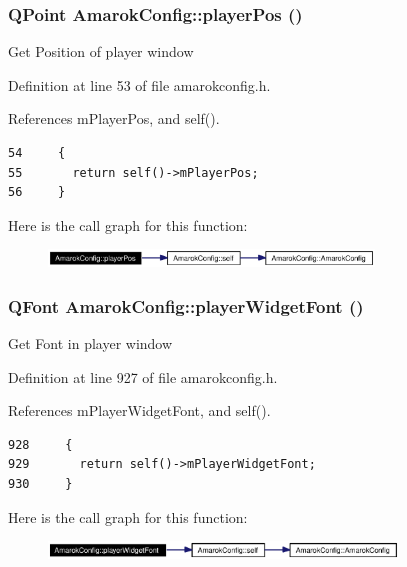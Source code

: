 \subsubsection{\setlength{\rightskip}{0pt plus 5cm}QPoint Amarok\-Config::player\-Pos ()\hspace{0.3cm}{\tt  [inline, static]}}\label{classAmarokConfig_AmarokConfige4}


Get Position of player window 

Definition at line 53 of file amarokconfig.h.

References m\-Player\-Pos, and self().



\footnotesize\begin{verbatim}54     {
55       return self()->mPlayerPos;
56     }
\end{verbatim}\normalsize 


Here is the call graph for this function:\begin{figure}[H]
\begin{center}
\leavevmode
\includegraphics[width=245pt]{classAmarokConfig_AmarokConfige4_cgraph}
\end{center}
\end{figure}
\subsubsection{\setlength{\rightskip}{0pt plus 5cm}QFont Amarok\-Config::player\-Widget\-Font ()\hspace{0.3cm}{\tt  [inline, static]}}\label{classAmarokConfig_AmarokConfige96}


Get Font in player window 

Definition at line 927 of file amarokconfig.h.

References m\-Player\-Widget\-Font, and self().



\footnotesize\begin{verbatim}928     {
929       return self()->mPlayerWidgetFont;
930     }
\end{verbatim}\normalsize 


Here is the call graph for this function:\begin{figure}[H]
\begin{center}
\leavevmode
\includegraphics[width=263pt]{classAmarokConfig_AmarokConfige96_cgraph}
\end{center}
\end{figure}
